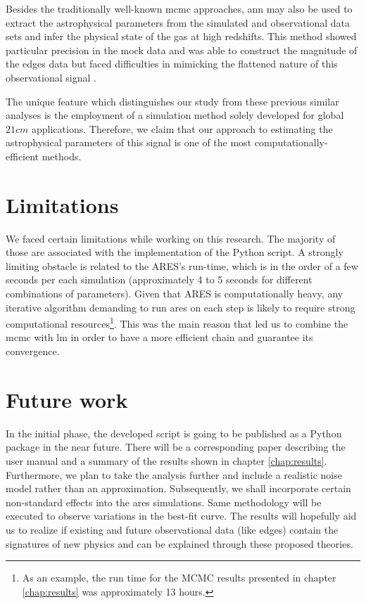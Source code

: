 \documentclass[12pt, TexShade, letterpaper]{report}
\begin{document}
Besides the traditionally well-known \gls{mcmc} approaches, \gls{ann} may also be used to extract the astrophysical parameters from the simulated and observational data sets and infer the physical state of the gas at high redshifts. This method showed particular precision in the mock data and was able to construct the magnitude of the \gls{edges} data but faced difficulties in mimicking the flattened nature of this observational signal \cite{pe_nn_1}.\par

The unique feature which distinguishes our study from these previous similar analyses is the employment of a simulation method solely developed for global $21cm$ applications. Therefore, we claim that our approach to estimating the astrophysical parameters of this signal is one of the most computationally-efficient methods.\par
\section{Limitations}
We faced certain limitations while working on this research. The majority of those are associated with the implementation of the Python script. 
A strongly limiting obstacle is related to the ARES's run-time, which is in the order of a few seconds per each simulation (approximately 4 to 5 seconds for different combinations of parameters). Given that ARES is computationally heavy, any iterative algorithm demanding to run \gls{ares} on each step is likely to require strong computational resources\footnote{ As an example, the run time for the MCMC results presented in chapter \ref{chap:results} was approximately 13 hours.}. This was the main reason that led us to combine the \gls{mcmc} with \gls{lm} in order to have a more efficient chain and guarantee its convergence.\par 
\section{Future work}
In the initial phase, the developed script is going to be published as a Python package in the near future. There will be a corresponding paper describing the user manual and a summary of the results shown in chapter \ref{chap:results}.
Furthermore, we plan to take the analysis further and include a realistic noise model rather than an approximation. Subsequently, we shall incorporate certain non-standard effects into the \gls{ares} simulations. Same methodology will be executed to observe variations in the best-fit curve. 
The results will hopefully aid us to realize if existing and future observational data (like \gls{edges})
contain the signatures of new physics and can be explained through these proposed theories.\par
\end{document}

